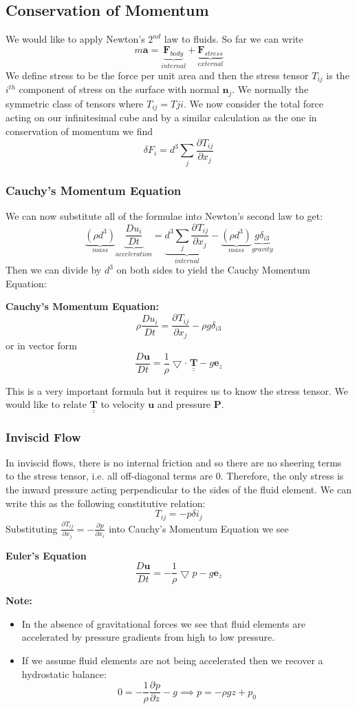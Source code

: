 \documentclass[11pt]{article}
\newcommand*{\pd}[3][]{\ensuremath{\frac{\partial^{#1} {#2}}{\partial {#3}^{#1}}}}
\newcommand*{\md}[1]{\ensuremath{\frac{D #1}{D t}}}
\newcommand{\grad}{\bigtriangledown}
\newcommand{\tul}[1]{\underline{\underline{#1}}}
\newcommand{\mv}[1]{\bm{#1}}
\newcommand{\mdf}[1]{{\color{red}#1}}
\newenvironment{note}
    {\textbf{Note:}\begin{mdframed}[backgroundcolor=white, roundcorner=5pt, linewidth=0pt]}
    {\end{mdframed}}
\newenvironment{formula}
	{\begin{mdframed}[backgroundcolor=white, roundcorner=5pt, linewidth=1pt, linecolor=red]}
	{\end{mdframed}}
\begin{document}
\subsection{Conservation of Momentum}
We would like to apply Newton's $2^{nd}$ law to fluids. So far we can write
$$m\mv{a}=\underbrace{ \mv{F}_{body} }_{internal}+\underbrace{\mv{F}_{stress}}_{external}$$
We define \mdf{stress} to be the force per unit area and then the \mdf{stress tensor} $T_{ij}$  is the $i^{th}$ component of stress on the surface with normal $\mv{n}_j$.
We normally the symmetric class of tensors where $T_{ij}=T{ji}$.
We now consider the total force acting on our infinitesimal cube and by a similar calculation as the one in conservation of momentum we find
$$\delta F_i=d^3\sum_j\pd{T_{ij}}{x_j}$$
\subsubsection{Cauchy's Momentum Equation}
We can now substitute all of the formulae into Newton's second law to get:
$$\underbrace{ (\rho d^3) }_{mass}\underbrace{ \md{u_i} }_{acceleration}=\underbrace{d^3\sum_j\pd{T_{ij}}{x_j}}_{internal} -\underbrace{(\rho d^3)}_{mass}\underbrace{g\delta_{i3}}_{gravity}$$
Then we can divide by $d^3$ on both sides to yield the Cauchy Momentum Equation:
\begin{formula}
\textbf{Cauchy's Momentum Equation:}
$$\rho\md{u_i}=\pd{T_{ij}}{x_j}-\rho g \delta_{i3}$$
or in vector form
$$\md{\mv{u}}=\frac{1}{\rho}\grad\cdot\;\tul{\mv{T}}-g\mv{e}_z$$
\end{formula}
This is a very important formula but it requires us to know the stress tensor. We would like to relate $\tul{\mv{T}}$ to velocity $\mv{u}$ and pressure $\mv{P}$. 
\subsubsection{Inviscid Flow}
In inviscid flows, there is no internal friction and so there are no sheering terms to the stress tensor, i.e. all off-diagonal terms are 0.
Therefore, the only stress is the inward pressure acting perpendicular to the sides of the fluid element.
We can write this as the following \mdf{constitutive relation}:
$$T_{ij}=-p\delta{i_j}$$
Substituting $\pd{T_{ij}}{x_j}=-\pd{p}{x_i}$ into Cauchy's Momentum Equation we see
\begin{formula}
	\textbf{Euler's Equation}
	$$\md{\mv{u}}=-\frac{1}{\rho}\grad{p}-g\mv{e}_z$$
\end{formula}
\begin{note}
\begin{itemize}
	\item In the absence of gravitational forces we see that fluid elements are accelerated by pressure gradients from high to low pressure.
	\item If we assume fluid elements are not being accelerated then we recover a hydrostatic balance:
		$$0=-\frac{1}{\rho}\pd{p}{z}-g\implies p=-\rho gz + p_0$$
\end{itemize}
\end{note}
\end{document}
